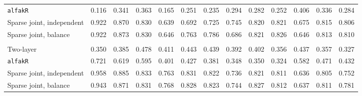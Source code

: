 \begin{center}
\begin{tabular}{l*{12}{r}}
\quad \texttt{alfakR} & 0.116 & 0.341 & 0.363 & 0.165 & 0.251 & 0.235 & 0.294 & 0.282 & 0.252 & 0.406 & 0.336 & 0.284 \\
\quad Sparse joint, independent & 0.922 & 0.870 & 0.830 & 0.639 & 0.692 & 0.725 & 0.745 & 0.820 & 0.821 & 0.675 & 0.815 & 0.806 \\
\quad Sparse joint, balance & 0.922 & 0.873 & 0.830 & 0.646 & 0.763 & 0.786 & 0.686 & 0.821 & 0.826 & 0.646 & 0.813 & 0.810 \\
\addlinespace[2pt]
\multicolumn{13}{l}{\textit{3000/100, 360 d}} \\
\quad Two-layer & 0.350 & 0.385 & 0.478 & 0.411 & 0.443 & 0.439 & 0.392 & 0.402 & 0.356 & 0.437 & 0.357 & 0.327 \\
\quad \texttt{alfakR} & 0.721 & 0.619 & 0.595 & 0.401 & 0.427 & 0.381 & 0.348 & 0.350 & 0.324 & 0.582 & 0.471 & 0.432 \\
\quad Sparse joint, independent & 0.958 & 0.885 & 0.833 & 0.763 & 0.831 & 0.822 & 0.736 & 0.821 & 0.811 & 0.636 & 0.805 & 0.752 \\
\quad Sparse joint, balance & 0.943 & 0.871 & 0.831 & 0.768 & 0.828 & 0.823 & 0.744 & 0.827 & 0.812 & 0.637 & 0.811 & 0.781 \\
\bottomrule
\end{tabular}
\end{center}

